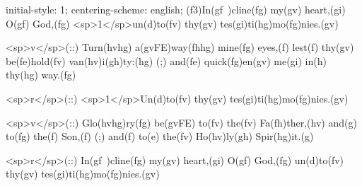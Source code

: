 initial-style: 1;
centering-scheme: english;
(f3)In(gf~)cline(fg) my(gv) heart,(gi) O(gf) God,(fg) <sp>1</sp>un(d)to(fv) thy(gv) tes(gi)ti(hg)mo(fg)nies.(gv)

<sp>v</sp>(::) Turn(hvhg) a(gvFE)way(fhhg) mine(fg) eyes,(f) lest(f) thy(gv) be(fe)hold(fv) van(hv)i(gh)ty:(hg) (;) and(fe) quick(fg)en(gv) me(gi) in(h) thy(hg) way.(fg)

<sp>r</sp>(::) <sp>1</sp>Un(d)to(fv) thy(gv) tes(gi)ti(hg)mo(fg)nies.(gv)

<sp>v</sp>(::) Glo(hvhg)ry(fg) be(gvFE) to(fv) the(fv) Fa(fh)ther,(hv) and(g) to(fg) the(f) Son,(f) (;) and(f) to(e) the(fv) Ho(hv)ly(gh) Spir(hg)it.(g)

<sp>r</sp>(::) In(gf~)cline(fg) my(gv) heart,(gi) O(gf) God,(fg) un(d)to(fv) thy(gv) tes(gi)ti(hg)mo(fg)nies.(gv)